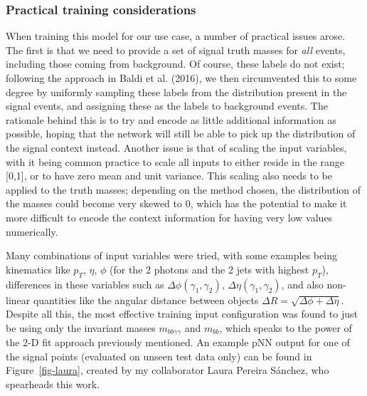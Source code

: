 \documentclass[
  11pt,
  numbers=noendperiod]{book}
\begin{document}
\hypertarget{practical-training-considerations}{%
\subsubsection*{Practical training
considerations}\label{practical-training-considerations}}

When training this model for our use case, a number of practical issues
arose. The first is that we need to provide a set of signal truth masses
for \emph{all} events, including those coming from background. Of
course, these labels do not exist; following the approach in Baldi et
al. (2016), we then circumvented this to some degree by uniformly
sampling these labels from the distribution present in the signal
events, and assigning these as the labels to background events. The
rationale behind this is to try and encode as little additional
information as possible, hoping that the network will still be able to
pick up the distribution of the signal context instead. Another issue is
that of scaling the input variables, with it being common practice to
scale all inputs to either reside in the range {[}0,1{]}, or to have
zero mean and unit variance. This scaling also needs to be applied to
the truth masses; depending on the method chosen, the distribution of
the masses could become very skewed to 0, which has the potential to
make it more difficult to encode the context information for having very
low values numerically.

Many combinations of input variables were tried, with some examples
being kinematics like \(p_T\), \(\eta\), \(\phi\) (for the 2 photons and
the 2 jets with highest \(p_T\)), differences in these variables such as
\(\Delta\phi(\gamma_1, \gamma_2)\), \(\Delta\eta(\gamma_1, \gamma_2)\),
and also non-linear quantities like the angular distance between objects
\(\Delta R = \sqrt{\Delta\phi + \Delta\eta}\). Despite all this, the
most effective training input configuration was found to just be using
only the invariant masses \(m_{bb\gamma\gamma}\) and \(m_{bb}\), which
speaks to the power of the 2-D fit approach previously mentioned. An
example pNN output for one of the signal points (evaluated on unseen
test data only) can be found in Figure~\ref{fig-laura}, created by my
collaborator Laura Pereira Sánchez, who spearheads this work.
\end{document}
